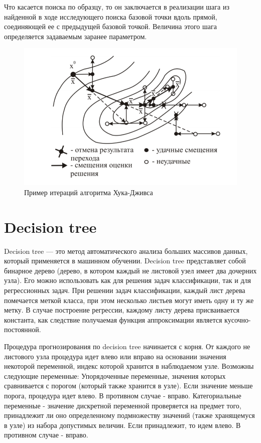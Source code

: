 \documentclass{svproc}
\begin{document}
Что касается поиска по образцу, то он заключается в реализации шага из найденной в ходе исследующего поиска базовой точки вдоль прямой, соединяющей ее с предыдущей базовой точкой. Величина этого шага определяется задаваемым заранее параметром.

\begin{figure}[!h]
	\begin{center}
		\begin{minipage}[h]{0.8\linewidth}
			\includegraphics[width=1\linewidth]{figure/fig1.png}
			\caption{Пример итераций алгоритма Хука-Дживса} %
			\label{fig:fig1}
		\end{minipage}
	\end{center}
\end{figure}	

\section{Decision tree}

Decision tree — это метод автоматического анализа больших массивов данных, который применяется в машинном обучении. Decision tree представляет собой бинарное дерево (дерево, в котором каждый не листовой узел имеет два дочерних узла). Его можно использовать как для решения задач классификации, так и для регрессионных задач. При решении задач классификации, каждый лист дерева помечается меткой класса, при этом несколько листьев могут иметь одну и ту же метку. В случае построение регрессии, каждому листу дерева присваивается константа, как следствие  получаемая функция аппроксимации является кусочно-постоянной.

Процедура прогнозирования по decision tree начинается с корня. От каждого не листового узла процедура идет влево или вправо на основании значения некоторой переменной, индекс которой хранится в наблюдаемом узле. Возможны следующие переменные:
Упорядоченные переменные, значения которых сравнивается с порогом (который также хранится в узле). Если значение меньше порога, процедура идет влево. В противном случае - вправо.
Категориальные переменные - значение дискретной переменной проверяется на предмет того, принадлежит ли оно определенному подмножеству значений (также хранящемуся в узле) из набора допустимых величин. Если принадлежит, то идем влево. В противном случае - вправо.
\end{document}

